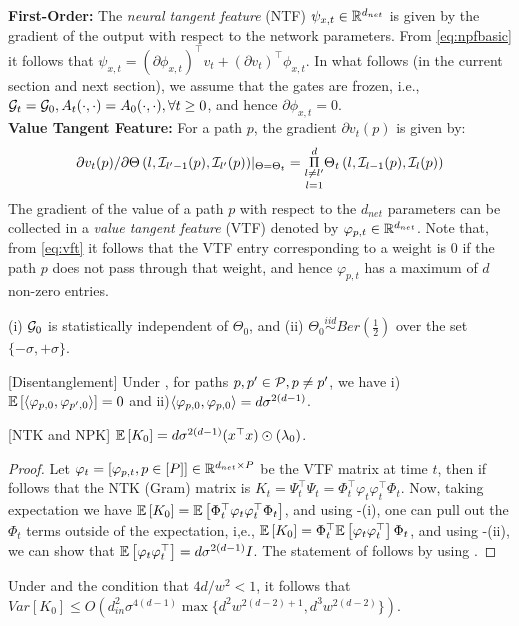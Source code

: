 \textbf{First-Order:} The \emph{neural tangent feature} (NTF) $\psi_{x,t}\in \R^{d_{net}}$ is given by the gradient of the output with respect to the network parameters. From \eqref{eq:npfbasic} it follows that $\psi_{x,t}=(\partial \phi_{x,t})^\top v_t +(\partial v_t)^\top\phi_{x,t}$. In what follows (in the current section and next section), we assume that the gates are frozen, i.e., $\G_t=\G_0, A_t(\cdot,\cdot)=A_0(\cdot,\cdot),\forall t\geq 0$, and hence $\partial \phi_{x,t}=0$.\hfill\\
\textbf{Value Tangent Feature:} For a path $p$, the gradient  $\partial v_t(p)$ is given by: \begin{align}\label{eq:vft}{\partial v_t(p)}/{\partial \Theta\left(l,\I_{l'-1}(p),\I_{l'}(p)\right)}|_{\Theta=\Theta_t}= \underset{l=1}{\underset{l\neq l'}{\overset{d}{\Pi}}} \Theta_t\left(l,\I_{l-1}(p),\I_{l}(p)\right)\end{align} The gradient of the value of a path $p$ with respect to the $d_{net}$ parameters can be collected in a \emph{value tangent feature} (VTF) denoted by $\varphi_{p,t}\in \R^{d_{net}}$. Note that, from \eqref{eq:vft} it follows that the VTF entry corresponding to a weight is $0$ if the path $p$ does not pass through that weight, and hence $\varphi_{p,t}$ has a maximum of $d$ non-zero entries.\hfill\\

\begin{assumption}\label{assmp:main}
(i) $\G_0$ is statistically independent of $\Theta_0$, and (ii) $\Theta_0\stackrel{iid}\sim Ber\left(\frac{1}{2}\right)$ over the set $\{-\sigma,+\sigma\}$. 
\end{assumption}
\begin{lemma}\label{lm:disentangle}[Disentanglement]
Under , for paths $p,p'\in \P, p\neq p'$, we have  i) $\E{\ip{\varphi_{p,0}, \varphi_{p',0}}}= 0$ and ii)${\ip{\varphi_{p,0}, \varphi_{p,0}}}= d\sigma^{2(d-1)}$.
\end{lemma}
\begin{theorem}\label{th:exp}[NTK and NPK]
$\E{K_0}=d\sigma^{2(d-1)}(x^\top x) \odot (\lambda_0)$.
\end{theorem}
\begin{proof} Let $\varphi_t=\left[\varphi_{p,t},p\in[P]\right]\in\R^{d_{net}\times P}$ be the VTF matrix at time $t$, then if follows that the NTK (Gram) matrix is  $K_t=\Psi^\top_t\Psi_t=\Phi^\top_t\varphi_t\varphi^\top_t\Phi_t$. Now, taking expectation we have $\E{K_0}=\E{\Phi^\top_t\varphi_t\varphi^\top_t\Phi_t}$, and using -(i), one can pull out the $\Phi_t$ terms outside of the expectation, i,e., $\E{K_0}=\Phi^\top_t\E{\varphi_t\varphi^\top_t}\Phi_t$, and using -(ii), we can show that $\E{\varphi_t\varphi^\top_t}=d\sigma^{2(d-1)}I$. The statement of  follows by using .
\end{proof}
\begin{theorem}\label{th:var}
Under  and the condition that ${4d}/{w^2}<1$, it follows that\hfill\\
$Var\left[K_0\right]\leq O\left(d^2_{in}\sigma^{4(d-1)}\max\{d^2w^{2(d-2)+1}, d^3w^{2(d-2)}\}\right)$.

\end{theorem}